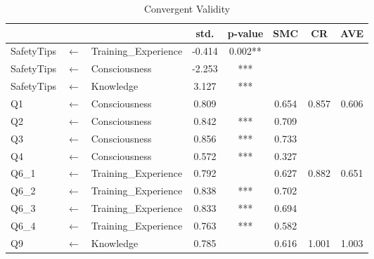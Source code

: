 \begin{table}[h]
  \caption{Convergent Validity}
  \label{table35}
  \centering
  \begin{tabular}{lcl|cc|ccc}
  \hline
   & & & std.   & p-value           & SMC                  & CR                     & AVE                    \\
\hline
SafetyTips           & $\longleftarrow$       & Training\_Experience & -0.414 & 0.002**                & \multicolumn{3}{l}{}    \\
SafetyTips           & $\longleftarrow$       & Consciousness        & -2.253 & ***                  & \multicolumn{3}{l}{} \\
SafetyTips           & $\longleftarrow$       & Knowledge            & 3.127  & ***                  & \multicolumn{3}{l}{}   \\
\hline
Q1                   & $\longleftarrow$       & Consciousness        & 0.809  &  & 0.654                & \multirow{4}{*}{0.857} & \multirow{4}{*}{0.606} \\
Q2                   & $\longleftarrow$       & Consciousness        & 0.842  & ***                  & 0.709                &                        &                        \\
Q3                   & $\longleftarrow$       & Consciousness        & 0.856  & ***                  & 0.733                &                        &                        \\
Q4                   & $\longleftarrow$       & Consciousness        & 0.572  & ***                  & 0.327                &                        &                        \\
\hline
Q6\_1                & $\longleftarrow$       & Training\_Experience & 0.792  &  & 0.627                & \multirow{4}{*}{0.882} & \multirow{4}{*}{0.651} \\
Q6\_2                & $\longleftarrow$       & Training\_Experience & 0.838  & ***                  & 0.702                &                        &                        \\
Q6\_3                & $\longleftarrow$       & Training\_Experience & 0.833  & ***                  & 0.694                &                        &                        \\
Q6\_4                & $\longleftarrow$       & Training\_Experience & 0.763  & ***                  & 0.582                &                        &                        \\
\hline
Q9                   & $\longleftarrow$       & Knowledge            & 0.785  &  & 0.616                & \multirow{2}{*}{1.001} & \multirow{2}{*}{1.003} \\

\end{tabular}
\end{table}
